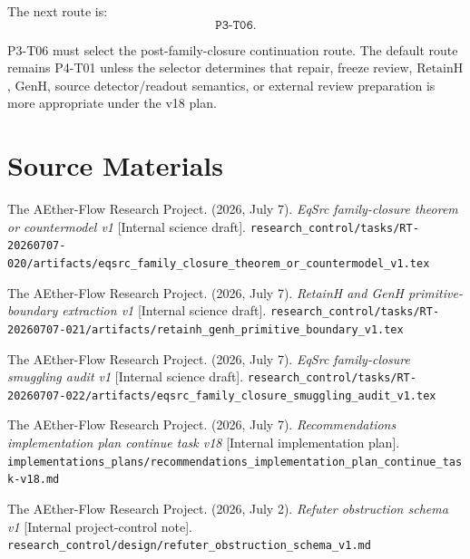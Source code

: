 \documentclass[11pt]{article}
\newcommand{\RetainH}{\mathrm{RetainH}}
\newcommand{\GenH}{\mathrm{GenH}}
\begin{document}
The next route is:
\[
  \texttt{P3-T06}.
\]

P3-T06 must select the post-family-closure continuation route. The default
route remains P4-T01 unless the selector determines that repair, freeze review,
\(\RetainH\), \(\GenH\), source detector/readout semantics, or external review
preparation is more appropriate under the v18 plan.

\section{Source Materials}

The AEther-Flow Research Project. (2026, July 7). \textit{EqSrc
family-closure theorem or countermodel v1} [Internal science draft].
\texttt{research\_control/tasks/RT-20260707-020/artifacts/eqsrc\_family\_closure\_theorem\_or\_countermodel\_v1.tex}

The AEther-Flow Research Project. (2026, July 7). \textit{RetainH and GenH
primitive-boundary extraction v1} [Internal science draft].
\texttt{research\_control/tasks/RT-20260707-021/artifacts/retainh\_genh\_primitive\_boundary\_v1.tex}

The AEther-Flow Research Project. (2026, July 7). \textit{EqSrc
family-closure smuggling audit v1} [Internal science draft].
\texttt{research\_control/tasks/RT-20260707-022/artifacts/eqsrc\_family\_closure\_smuggling\_audit\_v1.tex}

The AEther-Flow Research Project. (2026, July 7). \textit{Recommendations
implementation plan continue task v18} [Internal implementation plan].
\texttt{implementations\_plans/recommendations\_implementation\_plan\_continue\_task-v18.md}

The AEther-Flow Research Project. (2026, July 2). \textit{Refuter obstruction
schema v1} [Internal project-control note].
\texttt{research\_control/design/refuter\_obstruction\_schema\_v1.md}
\end{document}
